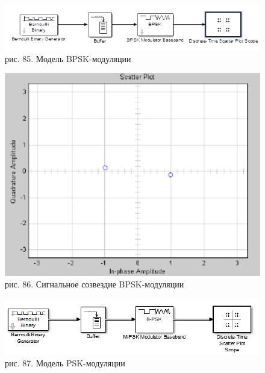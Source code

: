 \documentclass[10pt,a4paper]{report}
\begin{document}
\begin{figure}
\begin{center}
\includegraphics[width=150mm, scale = 0.9]{9_21}\newline
рис. 85. Модель BPSK-модуляции\newline
\end{center}
\end{figure}


\begin{figure}
\begin{center}
\includegraphics[width=150mm, scale = 0.9]{9_22}\newline
рис. 86. Сигнальное созвездие BPSK-модуляции\newline
\end{center}
\end{figure}
\begin{figure}
\begin{center}
\includegraphics[width=150mm, scale = 0.9]{9_23}\newline
рис. 87. Модель PSK-модуляции\newline
\end{center}
\end{figure}
\end{document}
